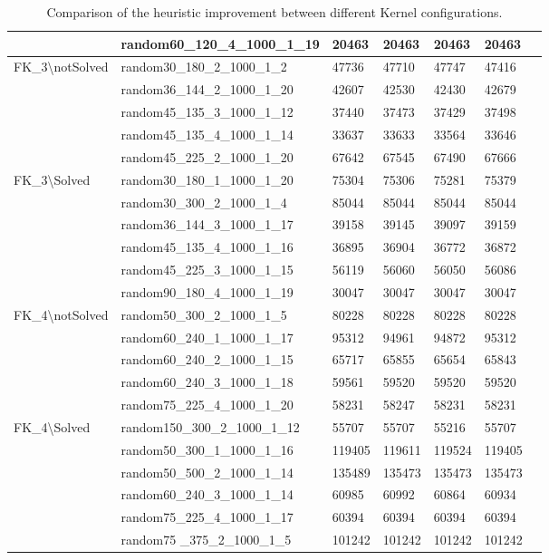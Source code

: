 \begin{table}[!htbp]
{\begin{tabular}{@{}lllllll@{}}
            & random60\_120\_4\_1000\_1\_19 &20463  &20463  &20463 &20463\\
            \midrule
            \multirow{5}{*}{FK\_3\textbackslash notSolved} 
            & random30\_180\_2\_1000\_1\_2 &47736  &47710  &47747  &47416\\  
            & random36\_144\_2\_1000\_1\_20 &42607  &42530  &42430  &42679\\  
            & random45\_135\_3\_1000\_1\_12 &37440  &37473  &37429  &37498\\  
            & random45\_135\_4\_1000\_1\_14 &33637  &33633  &33564  &33646\\  
            & random45\_225\_2\_1000\_1\_20 &67642 &67545  &67490 &67666\\ 
            \midrule
            \multirow{6}{*}{FK\_3\textbackslash Solved}
            & random30\_180\_1\_1000\_1\_20 &75304 &75306  &75281  &75379\\  
            & random30\_300\_2\_1000\_1\_4 &85044 &85044  &85044  &85044\\  
            & random36\_144\_3\_1000\_1\_17 &39158 &39145  &39097  &39159\\  
            & random45\_135\_4\_1000\_1\_16 &36895 &36904  &36772  &36872\\  
            & random45\_225\_3\_1000\_1\_15 &56119 &56060  &56050  &56086\\  
            & random90\_180\_4\_1000\_1\_19 &30047 &30047  &30047 &30047\\  
            \midrule
            \multirow{5}{*}{FK\_4\textbackslash notSolved}
            & random50\_300\_2\_1000\_1\_5 &80228 &80228  &80228  &80228\\  
            & random60\_240\_1\_1000\_1\_17 &95312 &94961  &94872  &95312\\  
            & random60\_240\_2\_1000\_1\_15 &65717 &65855  &65654  &65843\\  
            & random60\_240\_3\_1000\_1\_18 &59561 &59520  &59520  &59520\\  
            & random75\_225\_4\_1000\_1\_20 &58231 &58247  &58231 &58231\\ 
            \midrule
            \multirow{6}{*}{FK\_4\textbackslash Solved}
            & random150\_300\_2\_1000\_1\_12 &55707 &55707  &55216  &55707\\  
            & random50\_300\_1\_1000\_1\_16 &119405  &119611  &119524  &119405\\  
            & random50\_500\_2\_1000\_1\_14 &135489  &135473  &135473  &135473\\  
            & random60\_240\_3\_1000\_1\_14  &60985  &60992  &60864 &60934\\  
            & random75\_225\_4\_1000\_1\_17 &60394  &60394  &60394 &60394\\  
            & random75 \_375\_2\_1000\_1\_5 &101242  &101242 &101242 &101242\\ 
            \bottomrule
        \end{tabular}
        }
    \caption{Comparison of the heuristic improvement between different Kernel configurations.}
    \label{tab:comp_heu}
\end{table}
